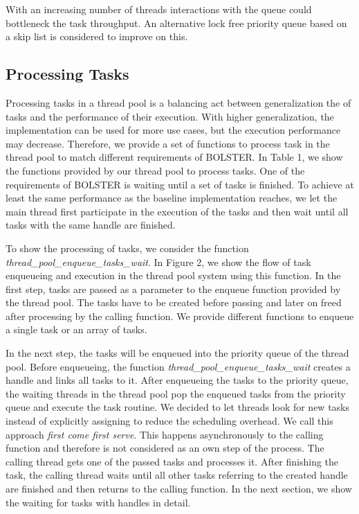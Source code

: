 \documentclass[conference]{IEEEtran}
\begin{document}
With an increasing number of threads interactions with the queue could bottleneck the task throughput. An alternative lock free priority queue \cite{it:2018-003} based on a skip list is considered to improve on this.
\subsection{Processing Tasks}
Processing tasks in a thread pool is a balancing act between generalization the of tasks and the performance of their execution. With higher generalization, the implementation can be used for more use cases, but the execution performance may decrease. Therefore, we provide a set of functions to process task in the thread pool to match different requirements of BOLSTER. In Table 1, we show the functions provided by our thread pool to process tasks. One of the requirements of BOLSTER is waiting until a set of tasks is finished. To achieve at least the same performance as the baseline implementation reaches, we let the main thread first participate in the execution of the tasks and then wait until all tasks with the same handle are finished.

To show the processing of tasks, we consider the function \emph{thread\_pool\_enqueue\_tasks\_wait}. In Figure 2, we show the flow of task enqueueing and execution in the thread pool system using this function. In the first step, tasks are passed as a parameter to the enqueue function provided by the thread pool. The tasks have to be created before passing and later on freed after processing by the calling function.  We provide different functions to enqueue a single task or an array of tasks.

In the next step, the tasks will be enqueued into the priority queue of the thread pool. Before enqueueing, the function \emph{thread\_pool\_enqueue\_tasks\_wait} creates a handle and links all tasks to it. After enqueueing the tasks to the priority queue, the waiting threads in the thread pool pop the enqueued tasks from the priority queue and execute the task routine. We decided to let threads look for new tasks instead of explicitly assigning to reduce the scheduling overhead. We call this approach \emph{first come first serve}. This happens asynchronously to the calling function and therefore is not considered as an own step of the process. The calling thread gets one of the passed tasks and processes it. After finishing the task, the calling thread waits until all other tasks referring to the created handle are finished and then returns to the calling function. In the next section, we show the waiting for tasks with handles in detail.
\end{document}
